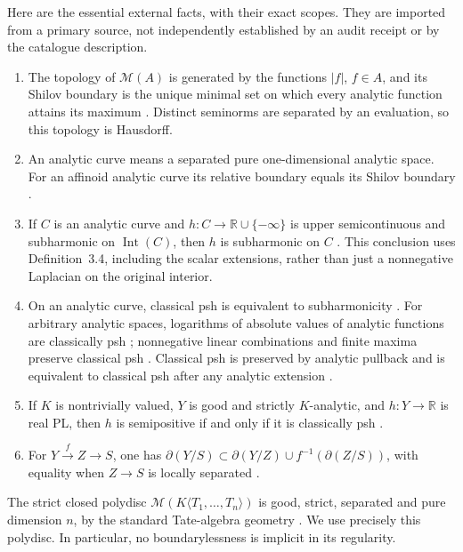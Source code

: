 \documentclass[11pt]{article}
\newcommand{\Int}{\operatorname{Int}}
\begin{document}
Here are the essential external facts, with their exact scopes. They
are imported from a primary source, not independently established by
an audit receipt or by the catalogue description.
\begin{enumerate}
\item The topology of $\mathcal M(A)$ is generated by the functions
$|f|$, $f\in A$, and its Shilov boundary is the unique minimal set on
which every analytic function attains its maximum
\cite[\S2.4]{GR}. Distinct seminorms are separated by an evaluation,
so this topology is Hausdorff.
\item An analytic curve means a separated pure one-dimensional analytic
space. For an affinoid analytic curve its relative boundary equals its
Shilov boundary \cite[\S3.1(3)]{GR}.
\item If $C$ is an analytic curve and $h:C\to\mathbb R\cup\{-\infty\}$
is upper semicontinuous and subharmonic on $\Int(C)$, then $h$ is
subharmonic on $C$ \cite[Proposition~3.5(3)]{GR}. This conclusion uses
Definition~3.4, including the scalar extensions, rather than just a
nonnegative Laplacian on the original interior.
\item On an analytic curve, classical psh is equivalent to subharmonicity
\cite[\S4.1.2]{GR}. For arbitrary analytic spaces, logarithms of absolute
values of analytic functions are classically psh
\cite[Proposition~4.2(2)]{GR}; nonnegative linear combinations and finite
maxima preserve classical psh \cite[Proposition~4.2(3)]{GR}.
Classical psh is preserved by analytic pullback and is equivalent to
classical psh after any analytic extension
\cite[Proposition~4.2(5),(6), forward direction of (6)]{GR}.
\item If $K$ is nontrivially valued, $Y$ is good and strictly $K$-analytic,
and $h:Y\to\mathbb R$ is real PL, then $h$ is semipositive if and only
if it is classically psh \cite[Theorem~4.3]{GR}.
\item For $Y\xrightarrow{f}Z\to S$, one has
$\partial(Y/S)\subset\partial(Y/Z)\cup f^{-1}(\partial(Z/S))$,
with equality when $Z\to S$ is locally separated
\cite[\S2.11(4), equations (2.11.3)--(2.11.4)]{GR}.
\end{enumerate}
The strict closed polydisc
$\mathcal M(K\langle T_1,\ldots,T_n\rangle)$ is good, strict, separated
and pure dimension $n$, by the standard Tate-algebra geometry
\cite[Chapter~2, \S2.1]{Ber}. We use precisely this polydisc. In
particular, no boundarylessness is implicit in its regularity.
\end{document}
